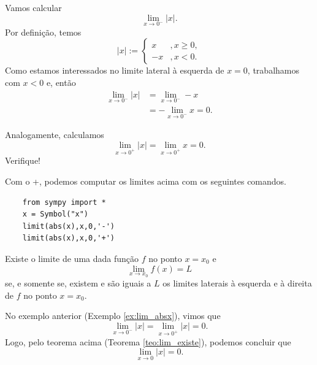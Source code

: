 \begin{exer}\label{ex:lim_absx}
  Vamos calcular
  \begin{equation}
    \lim_{x\to 0^-} |x|.
  \end{equation}
  Por definição, temos
  \begin{equation}
    |x| := \left\{
      \begin{array}{ll}
        x &, x\geq 0,\\
        -x &, x< 0.
      \end{array}
    \right.
  \end{equation}
  Como estamos interessados no limite lateral à esquerda de $x=0$, trabalhamos com $x<0$ e, então
  \begin{align}
    \lim_{x\to 0^-} |x| &= \lim_{x\to 0^-} -x\\
                        &= -\lim_{x\to 0^-} x = 0.
  \end{align}
  
  Analogamente, calculamos
  \begin{equation}
    \lim_{x\to 0^+} |x| = \lim_{x\to 0^+} x = 0.
  \end{equation}
  Verifique!

  \ifispython
  Com o {\python}+{\sympy}, podemos computar os limites acima com os seguintes comandos.
  \begin{lstlisting}
    from sympy import *
    x = Symbol("x")
    limit(abs(x),x,0,'-')
    limit(abs(x),x,0,'+')
  \end{lstlisting}
  \fi
\end{exer}

\begin{teo}\label{teo:lim_existe}
  Existe o limite de uma dada função $f$ no ponto $x=x_0$ e
  \begin{equation}
    \lim_{x\to x_0} f(x) = L
  \end{equation}
  se, e somente se, existem e são iguais a $L$ os limites laterais à esquerda e à direita de $f$ no ponto $x=x_0$.
\end{teo}

\begin{exer}
  No exemplo anterior (Exemplo \ref{ex:lim_absx}), vimos que
  \begin{equation}
    \lim_{x\to 0^-} |x| = \lim_{x\to 0^+} |x| = 0.
  \end{equation}
  Logo, pelo teorema acima (Teorema \ref{teo:lim_existe}), podemos concluir que
  \begin{equation}
    \lim_{x\to 0} |x| = 0.
  \end{equation}
\end{exer}

